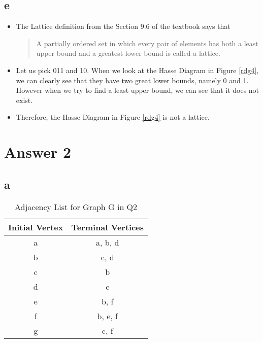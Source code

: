 \documentclass[11pt]{article}
\begin{document}
\subsection*{e}

\begin{itemize}
    \item The Lattice definition from the Section 9.6 of the textbook says that 
    \begin{quote}
        A partially ordered set in which every pair of elements has both a least upper bound and a greatest lower bound is called a lattice.
    \end{quote}
    \item Let us pick 011 and 10. When we look at the Hasse Diagram in Figure \ref{rdg4}, we can clearly see that they have two great lower bounds, namely 0 and 1. However when we try to find a least upper bound, we can see that it does not exist. 
    \item Therefore, the Hasse Diagram in Figure \ref{rdg4} is not a lattice.
\end{itemize}


\section*{Answer 2}
\subsection*{a}

\begin{table}[H]
    \centering
    \begin{tabular}{|c|c|}	
    \hline 							
    \textbf{Initial Vertex} & \textbf{Terminal Vertices}  \\
    \hline 
    \hline 
    a & a, b, d \\ \hline
    b & c, d \\ \hline
    c & b \\ \hline
    d & c \\ \hline
    e & b, f \\ \hline
    f & b, e, f \\ \hline
    g & c, f \\ \hline
    \end{tabular}
    \caption{ Adjacency List for Graph G in Q2 }
    \end{table}
\end{document}

